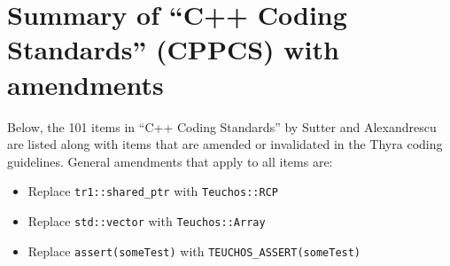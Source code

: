 %
\section{Summary of ``C++ Coding Standards'' (CPPCS) with amendments}
\label{sec:cpp_coding_standards}
%

Below, the 101 items in ``C++ Coding Standards'' by Sutter and Alexandrescu
{}\cite{C++CodingStandards05} are listed along with items that are amended or
invalidated in the Thyra coding guidelines.  General amendments that apply to
all items are:

\begin{itemize}

{}\item Replace {}\texttt{tr1::shared\_ptr} with {}\texttt{Teuchos::RCP}

{}\item Replace {}\texttt{std::vector} with {}\texttt{Teuchos::Array}

{}\item Replace {}\texttt{assert(someTest)} with
{}\texttt{TEUCHOS\_ASSERT(someTest)}

\end{itemize}

